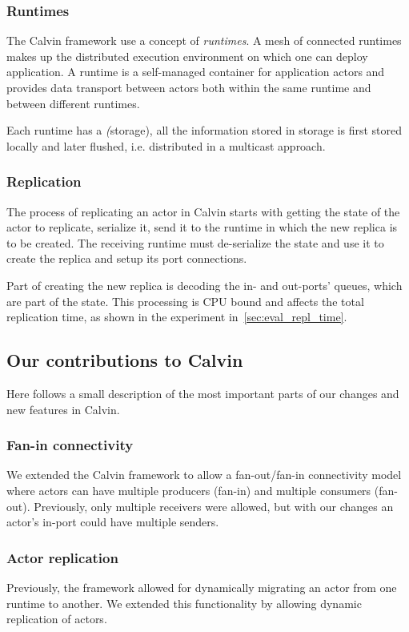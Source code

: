 \documentclass{cslthse-msc}
\begin{document}
\subsubsection{Runtimes} \label{sec:calvin_runtime}
The Calvin framework use a concept of \emph{runtimes}. A mesh of connected runtimes makes up the distributed execution environment on which one can deploy application. A runtime is a self-managed container for application actors and provides data transport between actors both within the same runtime and between different runtimes.

Each runtime has a \emph(storage), all the information stored in storage is first stored locally and later flushed, i.e. distributed in a multicast approach.

\subsubsection{Replication} \label{subsec:calvin_replication}
The process of replicating an actor in Calvin starts with getting the state of the actor to replicate, serialize it, send it to the runtime in which the new replica is to be created. The receiving runtime must de-serialize the state and use it to create the replica and setup its port connections.

Part of creating the new replica is decoding the in- and out-ports' queues, which are part of the state. This processing is CPU bound and affects the total replication time, as shown in the experiment in~\cref{sec:eval_repl_time}.

\subsection{Our contributions to Calvin} \label{subsec:design_contributions} %
Here follows a small description of the most important parts of our changes and new features in Calvin.

\subsubsection{Fan-in connectivity}
We extended the Calvin framework to allow a fan-out/fan-in connectivity model where actors can have multiple producers (fan-in) and multiple consumers (fan-out). Previously, only multiple receivers were allowed, but with our changes an actor's in-port could have multiple senders.

\subsubsection{Actor replication}
Previously, the framework allowed for dynamically migrating an actor from one runtime to another. We extended this functionality by allowing dynamic replication of actors. 
\end{document}
